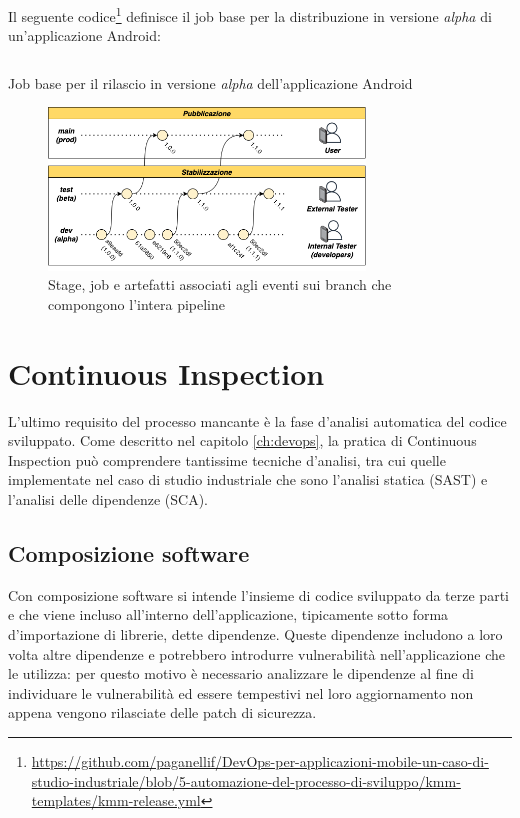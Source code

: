 Il seguente codice\footnote{\href{https://github.com/paganellif/DevOps-per-applicazioni-mobile-un-caso-di-studio-industriale/blob/5-automazione-del-processo-di-sviluppo/kmm-templates/kmm-release.yml}{https://github.com/paganellif/DevOps-per-applicazioni-mobile-un-caso-di-studio-industriale/blob/5-automazione-del-processo-di-sviluppo/kmm-templates/kmm-release.yml}} definisce il job base per la distribuzione in versione \textit{alpha} di un'applicazione Android:

\begin{listing}[H]
    \inputminted{yaml}{code/android-alpha-release-job.yaml}
    \caption{Job base per il rilascio in versione \textit{alpha} dell'applicazione Android}
\end{listing}

\begin{figure}[H]
    \centering
    \includegraphics[width=0.75\textwidth]{img/release-flow.png}
    \caption{Stage, job e artefatti associati agli eventi sui branch che compongono l'intera pipeline}
    \label{release-alpha-beta-flow}
\end{figure}

\section{Continuous Inspection}
L'ultimo requisito del processo mancante è la fase d'analisi automatica del codice sviluppato.
Come descritto nel capitolo \ref{ch:devops},
la pratica di Continuous Inspection può comprendere tantissime tecniche d'analisi, 
tra cui quelle implementate nel caso di studio industriale che sono l'analisi statica (SAST) e l'analisi delle dipendenze (SCA).

\subsection{Composizione software}
Con composizione software si intende l'insieme di codice sviluppato da terze parti e che viene incluso all'interno dell'applicazione, 
tipicamente sotto forma d'importazione di librerie, 
dette dipendenze. 
Queste dipendenze includono a loro volta altre dipendenze e potrebbero introdurre vulnerabilità nell'applicazione che le utilizza: 
per questo motivo è necessario analizzare le dipendenze al fine di individuare le vulnerabilità ed essere tempestivi nel loro aggiornamento non appena vengono rilasciate delle patch di sicurezza. 

